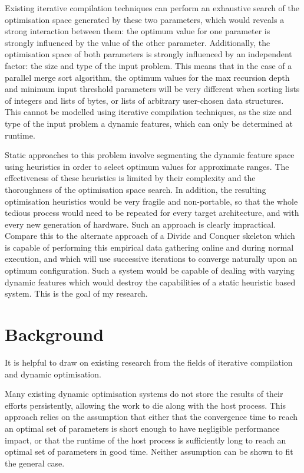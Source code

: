 Existing iterative compilation techniques can perform an exhaustive
search of the optimisation space generated by these two parameters,
which would reveals a strong interaction between them: the optimum
value for one parameter is strongly influenced by the value of the
other parameter. Additionally, the optimisation space of both
parameters is strongly influenced by an independent factor: the size
and type of the input problem. This means that in the case of a
parallel merge sort algorithm, the optimum values for the max
recursion depth and minimum input threshold parameters will be very
different when sorting lists of integers and lists of bytes, or lists
of arbitrary user-chosen data structures. This cannot be modelled
using iterative compilation techniques, as the size and type of the
input problem a dynamic features, which can only be determined at
runtime.

Static approaches to this problem involve segmenting the dynamic
feature space using heuristics in order to select optimum values for
approximate ranges. The effectiveness of these heuristics is limited
by their complexity and the thoroughness of the optimisation space
search. In addition, the resulting optimisation heuristics would be
very fragile and non-portable, so that the whole tedious process would
need to be repeated for every target architecture, and with every new
generation of hardware. Such an approach is clearly
impractical. Compare this to the alternate approach of a Divide and
Conquer skeleton which is capable of performing this empirical data
gathering online and during normal execution, and which will use
successive iterations to converge naturally upon an optimum
configuration. Such a system would be capable of dealing with varying
dynamic features which would destroy the capabilities of a static
heuristic based system. This is the goal of my research.

\section{Background}

It is helpful to draw on existing research from the fields of
iterative compilation and dynamic optimisation.

Many existing dynamic optimisation systems do not store the results of
their efforts persistently, allowing the work to die along with the
host process. This approach relies on the assumption that either that
the convergence time to reach an optimal set of parameters is short
enough to have negligible performance impact, or that the runtime of
the host process is sufficiently long to reach an optimal set of
parameters in good time. Neither assumption can be shown to fit the
general case.

